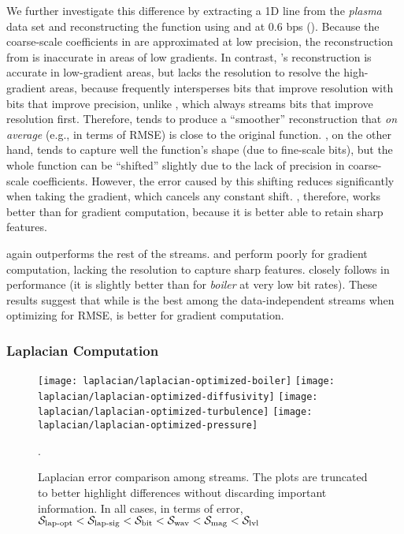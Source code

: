We further investigate this difference by extracting a 1D line from the \emph{plasma} data set and
reconstructing the function using \sbit and \swav at 0.6 bps
(). Because the coarse-scale coefficients in \sbit are
approximated at low precision, the reconstruction from \sbit is inaccurate in areas of low
gradients. In contrast, \swav's reconstruction is accurate in low-gradient areas, but lacks the
resolution to resolve the high-gradient areas, because \swav frequently intersperses bits that
improve resolution with bits that improve precision, unlike \sbit, which always streams bits that
improve resolution first. Therefore, \swav tends to produce a ``smoother'' reconstruction that
\emph{on average} (e.g., in terms of RMSE) is close to the original function. \sbit, on the other
hand, tends to capture well the function's shape (due to fine-scale bits), but the whole function
can be ``shifted'' slightly due to the lack of precision in coarse-scale coefficients. However, the
error caused by this shifting reduces significantly when taking the gradient, which cancels any
constant shift. \sbit, therefore, works better than \swav for gradient computation, because it is
better able to retain sharp features.

\sgop again outperforms the rest of the streams. \slvl and \smag perform poorly for gradient
computation, lacking the resolution to capture sharp features. \sgsg closely follows \sbit in
performance (it is slightly better than \sbit for \emph{boiler} at very low bit rates). These
results suggest that while \swav is the best among the data-independent streams when optimizing for
RMSE, \sbit is better for gradient computation.

\subsubsection{Laplacian Computation}\label{sec:laplacian}

\begin{figure*}[h]
\centering
{}
{\texttt{[image: laplacian/laplacian-optimized-boiler]}}
{\texttt{[image: laplacian/laplacian-optimized-diffusivity]}}
{\texttt{[image: laplacian/laplacian-optimized-turbulence]}}
{\texttt{[image: laplacian/laplacian-optimized-pressure]}}
\caption{Laplacian error comparison among streams. The plots are truncated to better highlight
differences without discarding important information. In all cases, in terms of error, $\slop <
\slsg < \sbit < \swav < \smag < \slvl$}.
\label{fig:laplacian-error-comparison}
\vspace{1em}
\end{figure*}

